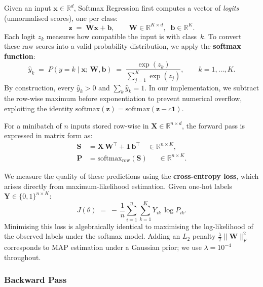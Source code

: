 \documentclass[11pt]{article}
\newcommand{\R}{\mathbb{R}}
\newcommand{\bx}{\mathbf{x}}
\newcommand{\bX}{\mathbf{X}}
\newcommand{\bz}{\mathbf{z}}
\newcommand{\bW}{\mathbf{W}}
\newcommand{\bb}{\mathbf{b}}
\newcommand{\bY}{\mathbf{Y}}
\newcommand{\bP}{\mathbf{P}}
\newcommand{\bS}{\mathbf{S}}
\newcommand{\bone}{\mathbf{1}}
\begin{document}
Given an input $\bx \in \R^d$, Softmax Regression first computes a vector of \emph{logits} (unnormalised scores), one per class:
\begin{equation}\label{eq:logits}
  \bz \;=\; \bW\bx + \bb, \qquad \bW \in \R^{K \times d},\;\; \bb \in \R^K.
\end{equation}
Each logit $z_k$ measures how compatible the input is with class~$k$. To convert these raw scores into a valid probability distribution, we apply the \textbf{softmax function}:
\begin{equation}\label{eq:softmax}
  \hat{y}_k \;=\; P(y{=}k \mid \bx;\,\bW,\bb)
  \;=\; \frac{\exp(z_k)}{\displaystyle\sum_{j=1}^{K}\exp(z_j)},
  \qquad k = 1,\dots,K.
\end{equation}
By construction, every $\hat{y}_k > 0$ and $\sum_k \hat{y}_k = 1$. In our implementation, we subtract the row-wise maximum before exponentiation to prevent numerical overflow, exploiting the identity $\mathrm{softmax}(\bz) = \mathrm{softmax}(\bz - c\bone)$.

For a minibatch of $n$ inputs stored row-wise in $\bX \in \R^{n \times d}$, the forward pass is expressed in matrix form as:
\begin{align}
  \bS &= \bX\,\bW^\top + \bone\,\bb^\top \quad \in \R^{n \times K}, \label{eq:sr_scores}\\
  \bP &= \mathrm{softmax}_{\text{row}}(\bS) \quad\;\; \in \R^{n \times K}. \label{eq:sr_probs}
\end{align}

\noindent We measure the quality of these predictions using the \textbf{cross-entropy loss}, which arises directly from maximum-likelihood estimation. Given one-hot labels $\bY \in \{0,1\}^{n \times K}$:
\begin{equation}\label{eq:ce}
  J(\theta) \;=\; -\,\frac{1}{n}\sum_{i=1}^{n}\sum_{k=1}^{K}
  Y_{ik}\,\log P_{ik}.
\end{equation}
Minimising this loss is algebraically identical to maximising the log-likelihood of the observed labels under the softmax model. Adding an $L_2$ penalty $\frac{\lambda}{2}\|\bW\|_F^2$ corresponds to MAP estimation under a Gaussian prior; we use $\lambda = 10^{-4}$ throughout.

\subsubsection*{Backward Pass}
\end{document}
